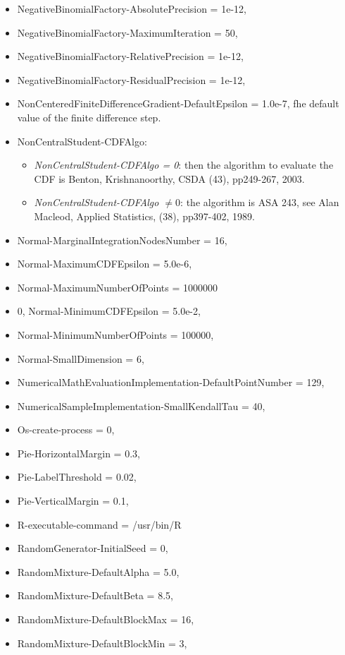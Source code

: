 \begin{itemize}
\item
  NegativeBinomialFactory-AbsolutePrecision = 1e-12,
\item
  NegativeBinomialFactory-MaximumIteration = 50,
\item
  NegativeBinomialFactory-RelativePrecision = 1e-12,
\item
  NegativeBinomialFactory-ResidualPrecision = 1e-12,
\item
  NonCenteredFiniteDifferenceGradient-DefaultEpsilon = 1.0e-7,
  fhe default value of the finite difference step.
\item NonCentralStudent-CDFAlgo:
  \begin{itemize}
  \item \textit{NonCentralStudent-CDFAlgo = 0}: then the algorithm to evaluate the
    CDF is Benton, Krishnanoorthy, CSDA (43), pp249-267, 2003.
  \item  \textit{NonCentralStudent-CDFAlgo $\neq 0$}: the algorithm is ASA 243,
    see Alan Macleod, Applied  Statistics, (38), pp397-402, 1989.
  \end{itemize}
\item
  Normal-MarginalIntegrationNodesNumber = 16,
\item
  Normal-MaximumCDFEpsilon = 5.0e-6,
\item
  Normal-MaximumNumberOfPoints = 1000000
\item 0,
  Normal-MinimumCDFEpsilon = 5.0e-2,
\item
  Normal-MinimumNumberOfPoints = 100000,
\item
  Normal-SmallDimension = 6,
\item
  NumericalMathEvaluationImplementation-DefaultPointNumber = 129,
\item
  NumericalSampleImplementation-SmallKendallTau = 40,
\item
  Os-create-process = 0,
\item
  Pie-HorizontalMargin = 0.3,
\item
  Pie-LabelThreshold = 0.02,
\item
  Pie-VerticalMargin = 0.1,
\item
  R-executable-command = /usr/bin/R
\item
  RandomGenerator-InitialSeed = 0,
\item
  RandomMixture-DefaultAlpha = 5.0,
\item
  RandomMixture-DefaultBeta = 8.5,
\item
  RandomMixture-DefaultBlockMax = 16,
\item
  RandomMixture-DefaultBlockMin = 3,

\end{itemize}
